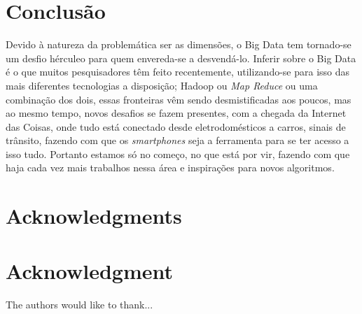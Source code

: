 \documentclass[conference,compsoc]{IEEEtran}
\begin{document}
\section{Conclusão}

Devido à natureza da problemática ser as dimensões, o Big Data tem tornado-se um desfio hérculeo para quem envereda-se a desvendá-lo.
Inferir sobre o Big Data é o que muitos pesquisadores têm feito recentemente, utilizando-se para isso das mais diferentes tecnologias a disposição; Hadoop ou \textit{Map Reduce} ou uma combinação dos dois, essas fronteiras vêm sendo desmistificadas aos poucos, mas ao mesmo tempo, novos desafios se fazem presentes, com a chegada da Internet das Coisas, onde tudo está conectado \cite{madeira}
desde eletrodomésticos \cite{mayumi} a carros, sinais de trânsito, fazendo com que os \textit{smartphones} seja a ferramenta para se ter acesso a isso tudo. \cite{singer}
Portanto estamos só no começo, no que está por vir, fazendo com que haja cada vez mais trabalhos nessa área e inspirações para novos algoritmos.




\ifCLASSOPTIONcompsoc
  \section*{Acknowledgments}
\else
  \section*{Acknowledgment}
\fi


The authors would like to thank...



\end{document}
